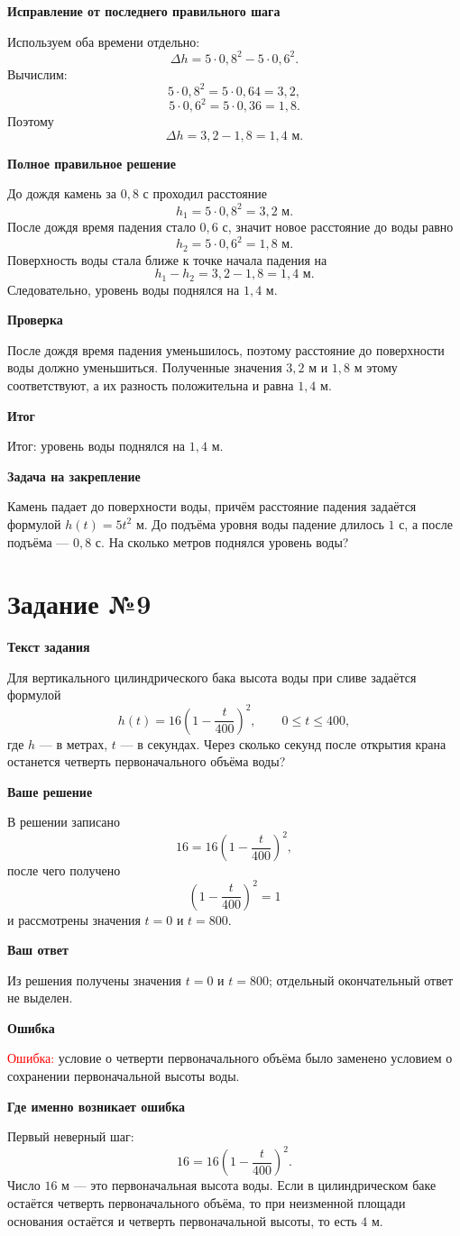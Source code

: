 \documentclass[12pt,a4paper]{article}
\newcommand{\tasktitle}[1]{\section*{Задание №#1}}
\newcommand{\subhead}[1]{\par\medskip\textbf{#1}\par\smallskip}
\begin{document}
\subhead{Исправление от последнего правильного шага}
Используем оба времени отдельно:
\[
\Delta h=5\cdot0{,}8^2-5\cdot0{,}6^2.
\]
Вычислим:
\[
5\cdot0{,}8^2=5\cdot0{,}64=3{,}2,
\]
\[
5\cdot0{,}6^2=5\cdot0{,}36=1{,}8.
\]
Поэтому
\[
\Delta h=3{,}2-1{,}8=1{,}4\text{ м}.
\]

\subhead{Полное правильное решение}
До дождя камень за $0{,}8$ с проходил расстояние
\[
h_1=5\cdot0{,}8^2=3{,}2\text{ м}.
\]
После дождя время падения стало $0{,}6$ с, значит новое расстояние до воды равно
\[
h_2=5\cdot0{,}6^2=1{,}8\text{ м}.
\]
Поверхность воды стала ближе к точке начала падения на
\[
h_1-h_2=3{,}2-1{,}8=1{,}4\text{ м}.
\]
Следовательно, уровень воды поднялся на $1{,}4$ м.

\subhead{Проверка}
После дождя время падения уменьшилось, поэтому расстояние до поверхности воды должно уменьшиться. Полученные значения $3{,}2$ м и $1{,}8$ м этому соответствуют, а их разность положительна и равна $1{,}4$ м.

\subhead{Итог}
\textcolor{teal!60!black}{Итог:} уровень воды поднялся на $1{,}4$ м.

\subhead{Задача на закрепление}
Камень падает до поверхности воды, причём расстояние падения задаётся формулой $h(t)=5t^2$ м. До подъёма уровня воды падение длилось $1$ с, а после подъёма --- $0{,}8$ с. На сколько метров поднялся уровень воды?

\newpage
{}\label{task:9}
\tasktitle{9}

\subhead{Текст задания}
Для вертикального цилиндрического бака высота воды при сливе задаётся формулой
\[
h(t)=16\left(1-\frac{t}{400}\right)^2,\qquad 0\le t\le400,
\]
где $h$ --- в метрах, $t$ --- в секундах. Через сколько секунд после открытия крана останется четверть первоначального объёма воды?

\subhead{Ваше решение}
В решении записано
\[
16=16\left(1-\frac{t}{400}\right)^2,
\]
после чего получено
\[
\left(1-\frac{t}{400}\right)^2=1
\]
и рассмотрены значения $t=0$ и $t=800$.

\subhead{Ваш ответ}
Из решения получены значения $t=0$ и $t=800$; отдельный окончательный ответ не выделен.

\subhead{Ошибка}
\textcolor{red}{Ошибка:} условие о четверти первоначального объёма было заменено условием о сохранении первоначальной высоты воды.

\subhead{Где именно возникает ошибка}
Первый неверный шаг:
\[
16=16\left(1-\frac{t}{400}\right)^2.
\]
Число $16$ м --- это первоначальная высота воды. Если в цилиндрическом баке остаётся четверть первоначального объёма, то при неизменной площади основания остаётся и четверть первоначальной высоты, то есть $4$ м.
\end{document}
